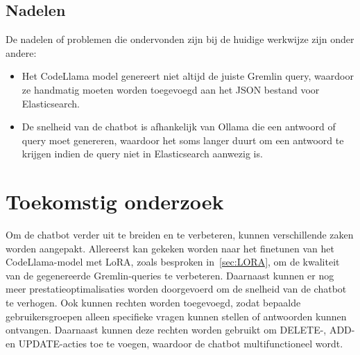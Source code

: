 \subsection{Nadelen}
De nadelen of problemen die ondervonden zijn bij de huidige werkwijze zijn onder andere:
\begin{itemize}
    \item Het CodeLlama model genereert niet altijd de juiste Gremlin query, waardoor ze handmatig moeten worden toegevoegd aan het JSON bestand voor Elasticsearch.
    \item De snelheid van de chatbot is afhankelijk van Ollama die een antwoord of query moet genereren, waardoor het soms langer duurt om een antwoord te krijgen indien de query niet in Elasticsearch aanwezig is.
\end{itemize}

\section{Toekomstig onderzoek}
Om de chatbot verder uit te breiden en te verbeteren, kunnen verschillende zaken worden aangepakt.
Allereerst kan gekeken worden naar het finetunen van het CodeLlama-model met LoRA, zoals besproken in~\ref{sec:LORA}, om de kwaliteit van de gegenereerde Gremlin-queries te verbeteren.
Daarnaast kunnen er nog meer prestatieoptimalisaties worden doorgevoerd om de snelheid van de chatbot te verhogen.
Ook kunnen rechten worden toegevoegd, zodat bepaalde gebruikersgroepen alleen specifieke vragen kunnen stellen of antwoorden kunnen ontvangen.
Daarnaast kunnen deze rechten worden gebruikt om DELETE-, ADD- en UPDATE-acties toe te voegen, waardoor de chatbot multifunctioneel wordt.


